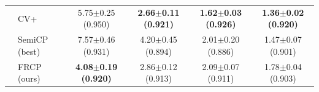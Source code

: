 \begin{table}[t]
\begin{tabular}{llcccc}
 & CV+ & 5.75$\pm$0.25 {\scriptsize(0.950)} & \textbf{2.66$\pm$0.11 {\scriptsize(0.921)}} & \textbf{1.62$\pm$0.03 {\scriptsize(0.926)}} & \textbf{1.36$\pm$0.02 {\scriptsize(0.920)}}\\
 & SemiCP (best) & 7.57$\pm$0.46 {\scriptsize(0.931)} & 4.20$\pm$0.45 {\scriptsize(0.894)} & 2.01$\pm$0.20 {\scriptsize(0.886)} & 1.47$\pm$0.07 {\scriptsize(0.901)}\\
 & FRCP (ours) & \textbf{4.08$\pm$0.19 {\scriptsize(0.920)}} & 2.86$\pm$0.12 {\scriptsize(0.913)} & 2.09$\pm$0.07 {\scriptsize(0.911)} & 1.78$\pm$0.04 {\scriptsize(0.903)}\\
\bottomrule
\end{tabular}
\end{table}
